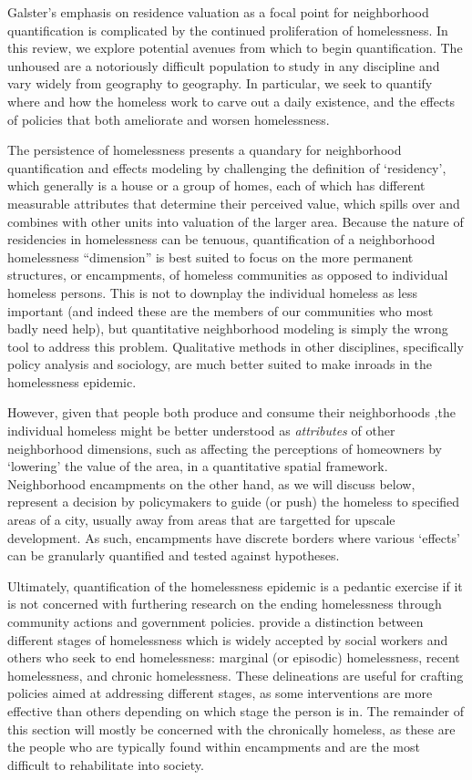 Galster's emphasis on residence valuation as a focal point for
neighborhood quantification is complicated by the continued
proliferation of homelessness.  In this review, we explore potential
avenues from which to begin quantification. The unhoused are a
notoriously difficult population to study in any discipline and vary
widely from geography to geography. In particular, we seek to quantify
where and how the homeless work to carve out a daily existence, and
the effects of policies that both ameliorate and worsen homelessness.

The persistence of homelessness presents a quandary for neighborhood
quantification and effects modeling by challenging the definition of
`residency', which generally is a house or a group of homes, each of
which has different measurable attributes that determine their
perceived value, which spills over and combines with other units into
valuation of the larger area. Because the nature of residencies in
homelessness can be tenuous, quantification of a neighborhood
homelessness ``dimension'' \citep{galster2001NatureNeighbourhood} is
best suited to focus on the more permanent structures, or encampments,
of homeless communities as opposed to individual homeless
persons. This is not to downplay the individual homeless as less
important (and indeed these are the members of our communities who
most badly need help), but quantitative neighborhood modeling is
simply the wrong tool to address this problem. Qualitative methods in
other disciplines, specifically policy analysis and sociology, are
much better suited to make inroads in the homelessness
epidemic.

However, given that people both produce and consume their
neighborhoods \citep{galster2001NatureNeighbourhood},the individual
homeless might be better understood as \emph{attributes} of other
neighborhood dimensions, such as affecting the perceptions of
homeowners by `lowering' the value of the area, in a quantitative
spatial framework. Neighborhood encampments on the other hand, as we
will discuss below, represent a decision by policymakers to guide (or
push) the homeless to specified areas of a city, usually away from
areas that are targetted for upscale development. As such, encampments
have discrete borders where various `effects' can be granularly
quantified and tested against hypotheses.

Ultimately, quantification of the homelessness epidemic is a pedantic
exercise if it is not concerned with furthering research on the
ending homelessness through community actions and government
policies. \cite{belcher1991ThreeStages} provide a distinction between
different stages of homelessness which is widely accepted by social
workers and others who seek to end homelessness: marginal (or
episodic) homelessness, recent homelessness, and chronic
homelessness. These delineations are useful for crafting policies
aimed at addressing different stages, as some interventions are more
effective than others depending on which stage the person is in. The
remainder of this section will mostly be concerned with the
chronically homeless, as these are the people who are typically found
within encampments and are the most difficult to rehabilitate into
society.


